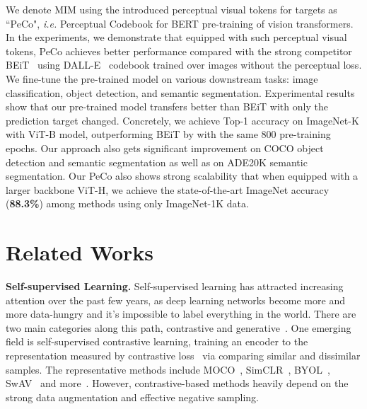 \documentclass[letterpaper]{article} \usepackage{aaai23}  \usepackage{times}  \usepackage{helvet}  \usepackage{courier}  \usepackage[hyphens]{url}  \usepackage{graphicx} \urlstyle{rm} \def\UrlFont{\rm}  \usepackage{natbib}  \usepackage{caption} \frenchspacing  \setlength{\pdfpagewidth}{8.5in}  \setlength{\pdfpageheight}{11in}  \usepackage{algorithm}
\newcommand{\ie}{\textit{i.e. }}
\begin{document}
We denote MIM using the introduced perceptual visual tokens for targets as ``PeCo", \ie Perceptual Codebook for BERT pre-training of vision transformers.
In the experiments, we demonstrate that equipped with such perceptual visual tokens, PeCo achieves better performance compared with the strong competitor BEiT~\cite{bao2021beit} using DALL-E~\cite{ramesh2021zero} codebook trained over  images without the perceptual loss.
We fine-tune the pre-trained model on various downstream tasks: image classification, object detection, and semantic segmentation. Experimental results show that our pre-trained model transfers better than  BEiT with only the prediction target changed. Concretely, we achieve  Top-1 accuracy on ImageNet-K with ViT-B model, outperforming BEiT by  with the same 800 pre-training epochs. Our approach also gets significant improvement on COCO object detection and semantic segmentation
as well as on ADE20K semantic segmentation. Our PeCo also shows strong scalability that when equipped with a larger backbone ViT-H, we achieve the state-of-the-art ImageNet accuracy (\textbf{88.3\%}) among methods using only ImageNet-1K data.

\section{Related Works}

\noindent \textbf{Self-supervised Learning.}
Self-supervised learning has attracted increasing attention over the past few years,
as deep learning networks become more and more data-hungry and it's impossible to label everything in the world.
There are two main categories along this path, contrastive and generative~\cite{liu2021self}.
One emerging field is self-supervised contrastive learning,
training an encoder to the representation measured by contrastive loss~\cite{hadsell2006dimensionality,dosovitskiy2014discriminative} via comparing similar and dissimilar samples. The representative methods include MOCO~\cite{he2020momentum,chen2020improved}, SimCLR~\cite{chen2020simple,chen2020big}, BYOL~\cite{grill2020bootstrap}, SwAV~\cite{caron2020unsupervised} and more~\cite{oord2018representation,li2021improve,bachman2019learning}.
However, contrastive-based methods heavily depend on the strong data augmentation and effective negative sampling.
\end{document}

